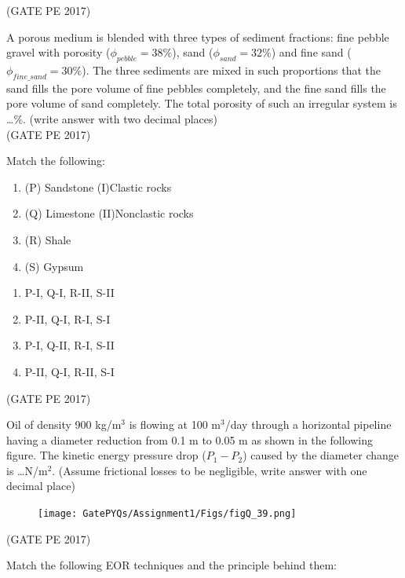 \documentclass[journal,12pt,onecolumn]{IEEEtran}
\theoremstyle{remark}
\begin{document}
\begin{enumerate}
{\hfill{(GATE PE 2017)}

\item A porous medium is blended with three types of sediment fractions: fine pebble gravel with porosity ($\phi_{pebble} = 38\%$), sand ($\phi_{sand} = 32\%$) and fine sand ($\phi_{fine\_sand} = 30\%$). The three sediments are mixed in such proportions that the sand fills the pore volume of fine pebbles completely, and the fine sand fills the pore volume of sand completely.
The total porosity of such an irregular system is \dots \%. (write answer with two decimal places)\\

\hfill{(GATE PE 2017)}

\item Match the following:\\
\begin{enumerate}
    \item (P) Sandstone  (I)Clastic rocks\\
    \item (Q) Limestone (II)Nonclastic rocks\\
    \item (R) Shale
    \item (S) Gypsum
\end{enumerate}
\begin{enumerate}
    \item P-I, Q-I, R-II, S-II
    \item P-II, Q-I, R-I, S-I
    \item P-I, Q-II, R-I, S-II
    \item P-II, Q-I, R-II, S-I
\end{enumerate}
\hfill{(GATE PE 2017)}

\item Oil of density 900 kg/m$^3$ is flowing at 100 m$^3$/day through a horizontal pipeline having a diameter reduction from 0.1 m to 0.05 m as shown in the following figure.
The kinetic energy pressure drop ($P_1 - P_2$) caused by the diameter change is \dots N/m$^2$.
(Assume frictional losses to be negligible, write answer with one decimal place)\\
\begin{figure}[h]
    \centering
    \texttt{[image: GatePYQs/Assignment1/Figs/figQ\_39.png]}
\end{figure}
\hfill{(GATE PE 2017)}

\item Match the following EOR techniques and the principle behind them:\\

}
\end{enumerate}
\end{document}
